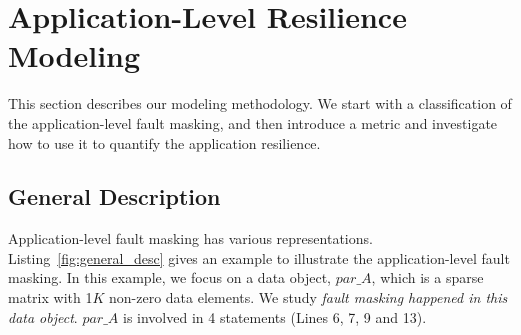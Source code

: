 \section{Application-Level Resilience \\ Modeling}
\label{sec:modeling}
This section describes our modeling methodology. %
We start with a classification of the application-level fault masking,
and then introduce a metric and investigate how to use it
to quantify the application resilience. %

\subsection{General Description}
\label{sec:general_bg}
Application-level fault masking has various representations.  
Listing~\ref{fig:general_desc} gives an example to illustrate the application-level fault masking. 
In this example, we focus on a data object, $par\_A$, which is a sparse matrix with 1$K$ non-zero data elements. We study \textit{fault masking happened in this data object}. $par\_A$ is involved in 4 statements (Lines 6, 7, 9 and 13). 


\begin{comment}
\begin{figure}
	\begin{center}
		\texttt{[image: general\_desc.pdf]} 
		\vspace{-8pt}
		\caption{An example code to show application-level fault masking}
		\label{fig:general_desc}
		\vspace{-20pt}
	\end{center}
\end{figure}
\end{comment}


